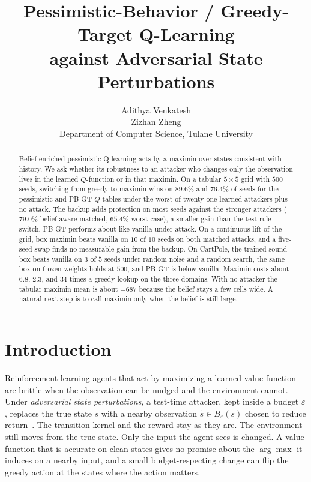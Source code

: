 \documentclass[10pt,twocolumn]{article}
\title{\vspace{-1.2em}Pessimistic-Behavior / Greedy-Target Q-Learning\\against Adversarial State Perturbations\vspace{-0.4em}}
\author{%
Adithya Venkatesh\\[0.55em]
Zizhan Zheng\\
{\small Department of Computer Science, Tulane University}%
}
\date{}
\begin{document}
\maketitle
\thispagestyle{empty}

\begin{abstract}
Belief-enriched pessimistic Q-learning acts by a maximin over states consistent with history.
We ask whether its robustness to an attacker who changes only the observation lives in the learned $Q$-function or in that maximin.
On a tabular $5{\times}5$ grid with $500$ seeds, switching from greedy to maximin wins on $89.6\%$ and $76.4\%$ of seeds for the pessimistic and PB-GT $Q$-tables under the worst of twenty-one learned attackers plus no attack.
The backup adds protection on most seeds against the stronger attackers ($79.0\%$ belief-aware matched, $65.4\%$ worst case), a smaller gain than the test-rule switch.
PB-GT performs about like vanilla under attack.
On a continuous lift of the grid, box maximin beats vanilla on $10$ of $10$ seeds on both matched attacks, and a five-seed swap finds no measurable gain from the backup.
On CartPole, the trained sound box beats vanilla on $3$ of $5$ seeds under random noise and a random search, the same box on frozen weights holds at $500$, and PB-GT is below vanilla.
Maximin costs about $6.8$, $2.3$, and $34$ times a greedy lookup on the three domains.
With no attacker the tabular maximin mean is about $-687$ because the belief stays a few cells wide.
A natural next step is to call maximin only when the belief is still large.
\end{abstract}

\section{Introduction}
\label{sec:intro}

Reinforcement learning agents that act by maximizing a learned value function are brittle when the observation can be nudged and the environment cannot.
Under \emph{adversarial state perturbations}, a test-time attacker, kept inside a budget $\varepsilon$, replaces the true state $s$ with a nearby observation $\tilde s\in B_\varepsilon(s)$ chosen to reduce return~\cite{huang2017adversarial,zhang2020robust}.
The transition kernel and the reward stay as they are.
The environment still moves from the true state.
Only the input the agent sees is changed.
A value function that is accurate on clean states gives no promise about the $\arg\max$ it induces on a nearby input, and a small budget-respecting change can flip the greedy action at the states where the action matters.
\end{document}
